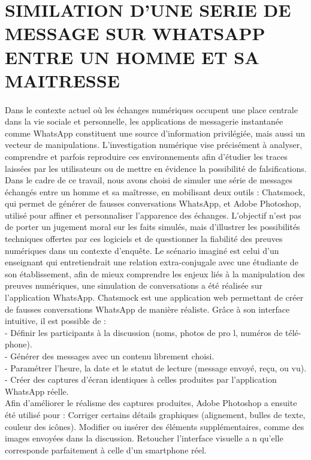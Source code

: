 \documentclass[]{article}
\begin{document}
\section{SIMILATION D’UNE SERIE DE MESSAGE SUR WHATSAPP ENTRE UN HOMME ET SA MAITRESSE}
\paragraph{}
Dans le contexte actuel où les échanges numériques occupent une place centrale dans
la vie sociale et personnelle, les applications de messagerie instantanée comme WhatsApp
constituent une source d'information privilégiée, mais aussi un vecteur de manipulations.
L'investigation numérique vise précisément à analyser, comprendre et parfois reproduire
ces environnements afin d'étudier les traces laissées par les utilisateurs ou de mettre en
évidence la possibilité de falsifications. Dans le cadre de ce travail, nous avons choisi de
simuler une série de messages échangés entre un homme et sa maîtresse, en mobilisant
deux outils : Chatsmock, qui permet de générer de fausses conversations WhatsApp, et
Adobe Photoshop, utilisé pour affiner et personnaliser l'apparence des échanges. L'objectif
n'est pas de porter un jugement moral sur les faits simulés, mais d'illustrer les possibilités
techniques offertes par ces logiciels et de questionner la fiabilité des preuves numériques
dans un contexte d'enquête. Le scénario imaginé est celui d’un enseignant qui entretiendrait une relation extra-conjugale avec une étudiante de son établissement, afin de mieux comprendre les enjeux liés à la manipulation des preuves numériques, une simulation de conversations a été réalisée sur l'application WhatsApp. Chatsmock est une application web permettant de créer de fausses conversations WhatsApp de manière réaliste. Grâce à son interface intuitive, il est possible de :\\
- Définir les participants à la discussion (noms, photos de pro l, numéros de télé-
phone).\\
- Générer des messages avec un contenu librement choisi.\\
- Paramétrer l'heure, la date et le statut de lecture (message envoyé, reçu, ou vu).\\
- Créer des captures d'écran identiques à celles produites par l'application WhatsApp
réelle.\\
Afin d'améliorer le réalisme des captures produites, Adobe Photoshop a ensuite été
utilisé pour : Corriger certains détails graphiques (alignement, bulles de texte, couleur des icônes). Modifier ou insérer des éléments supplémentaires, comme des images envoyées dans
la discussion. Retoucher l'interface visuelle a n qu'elle corresponde parfaitement à celle d'un
smartphone réel.
\end{document}
